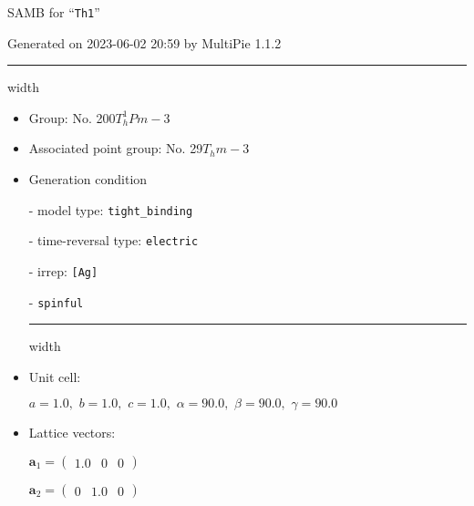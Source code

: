 \documentclass[fleqn,10pt,landscape]{article}
\begin{document}
\setcounter{MaxMatrixCols}{16}

\setlength{\baselineskip}{16pt}
\footnotesize
\begin{center}
\LARGE
SAMB for ``\texttt{Th1}''
\end{center}
\begin{flushright}
Generated on 2023-06-02 20:59 by MultiPie 1.1.2
\end{flushright}
\vspace{1cm}


 \hfil \hrule height 1mm width \textwidth \hfil

\begin{itemize}
\item Group: No. 200\quad$T_{h}^{1}$\quad$Pm-3$\quad[ cubic ]

\item Associated point group: No. 29\quad$T_{h}$\quad$m-3$\quad[ cubic ]

\vspace{5mm}

\item Generation condition

\quad - model type: \texttt{tight_binding}

\quad - time-reversal type: \texttt{electric}

\quad - irrep: \texttt{[Ag]}

\quad - \texttt{spinful}


 \hfil \hrule height 1mm width \textwidth \hfil

\item Unit cell:

\quad $a=1.0,\,\, b=1.0,\,\, c=1.0,\,\, \alpha=90.0,\,\, \beta=90.0,\,\, \gamma=90.0$

\item Lattice vectors:

\quad $\bm{a}_1=\begin{pmatrix} 1.0 & 0 & 0 \end{pmatrix}$

\quad $\bm{a}_2=\begin{pmatrix} 0 & 1.0 & 0 \end{pmatrix}$


\end{itemize}
\end{document}
